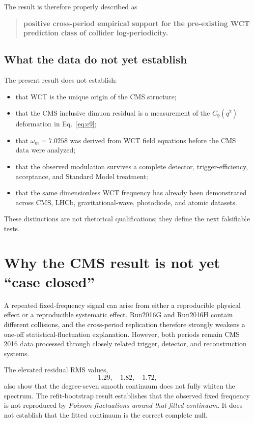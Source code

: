 \documentclass[11pt]{article}
\begin{document}
The result is therefore properly described as
\begin{quote}
\textbf{positive cross-period empirical support for the pre-existing WCT
prediction class of collider log-periodicity.}
\end{quote}

\subsection{What the data do not yet establish}

The present result does not establish:
\begin{itemize}
    \item that WCT is the unique origin of the CMS structure;
    \item that the CMS inclusive dimuon residual is a measurement of the
          \(C_9(q^2)\) deformation in Eq.~\eqref{eq:c9};
    \item that \(\omega_m=7.0258\) was derived from WCT field equations before
          the CMS data were analyzed;
    \item that the observed modulation survives a complete detector,
          trigger-efficiency, acceptance, and Standard Model treatment;
    \item that the same dimensionless WCT frequency has already been
          demonstrated across CMS, LHCb, gravitational-wave, photodiode, and
          atomic datasets.
\end{itemize}

These distinctions are not rhetorical qualifications; they define the next
falsifiable tests.

\section{Why the CMS result is not yet ``case closed''}

A repeated fixed-frequency signal can arise from either a reproducible physical
effect or a reproducible systematic effect.  Run2016G and Run2016H contain
different collisions, and the cross-period replication therefore strongly
weakens a one-off statistical-fluctuation explanation.  However, both periods
remain CMS 2016 data processed through closely related trigger, detector, and
reconstruction systems.

The elevated residual RMS values,
\begin{equation}
1.29,\quad1.82,\quad1.72,
\end{equation}
also show that the degree-seven smooth continuum does not fully whiten the
spectrum.  The refit-bootstrap result establishes that the observed fixed
frequency is not reproduced by \emph{Poisson fluctuations around that fitted
continuum}.  It does not establish that the fitted continuum is the correct
complete null.
\end{document}
